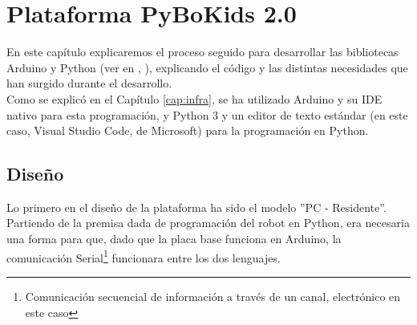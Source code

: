 \chapter{Plataforma PyBoKids 2.0}
\label{cap:PyBoKids}
En este capítulo explicaremos el proceso seguido para desarrollar las bibliotecas Arduino y Python (ver en \cite{arduinolenguaje}, \cite{PythonRef}), explicando el código y las distintas necesidades que han surgido durante el desarrollo. \\
Como se explicó en el Capítulo \ref{cap:infra}, se ha utilizado Arduino  y su IDE nativo para esta programación, y Python 3 y un editor de texto estándar (en este caso, Visual Studio Code, de Microsoft) para la programación en Python. 

\section{Diseño}\label{sec:diseño}
Lo primero en el diseño de la plataforma ha sido el modelo ''PC - Residente''. Partiendo de la premisa dada de programación del robot en Python, era necesaria una forma para que, dado que la placa base funciona en Arduino, la comunicación Serial\footnote{Comunicación secuencial de información a través de un canal, electrónico en este caso} funcionara entre los dos lenguajes. \\
